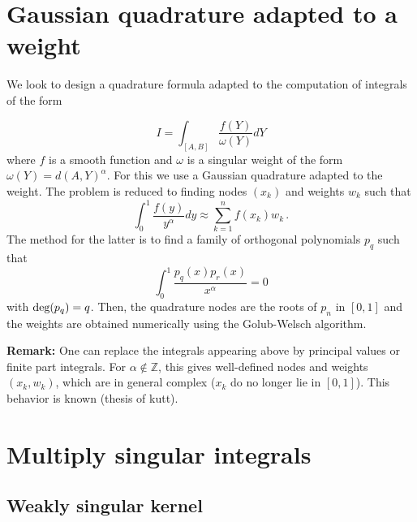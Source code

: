 \documentclass[french]{article}
\begin{document}
\section{Gaussian quadrature adapted to a weight}

We look to design a quadrature formula adapted to the computation of integrals of the form 

\[I = \int_{[A,B]} \frac{f(Y)}{\omega(Y)}dY\]
where $f$ is a smooth function and $\omega$ is a singular weight of the form $\omega(Y) = d(A,Y)^\alpha$. For this we use a Gaussian quadrature adapted to the weight. The problem is reduced to finding nodes $(x_k)$ and weights $w_k$ such that 
\[\int_{0}^1 \frac{f(y)}{y^\alpha} dy \approx \sum_{k = 1}^n f(x_k) w_k\,.\]
The method for the latter is to find a family of orthogonal polynomials $p_q$ such that 
\[\int_{0}^1 \frac{p_q(x) p_r(x)}{x^\alpha} = 0\]
with $\textup{deg}(p_q) = q$. Then, the quadrature nodes are the roots of $p_n$ in $[0,1]$ and the weights are obtained numerically using the Golub-Welsch algorithm. 


\textbf{Remark:} One can replace the integrals appearing above by principal values or finite part integrals. For $\alpha \notin \mathbb{Z}$, this gives well-defined nodes and weights $(x_k,w_k)$, which are in general complex ($x_k$ do no longer lie in $[0,1]$). This behavior is known (thesis of kutt). 


\section{Multiply singular integrals}


\subsection{Weakly singular kernel}
\end{document}
